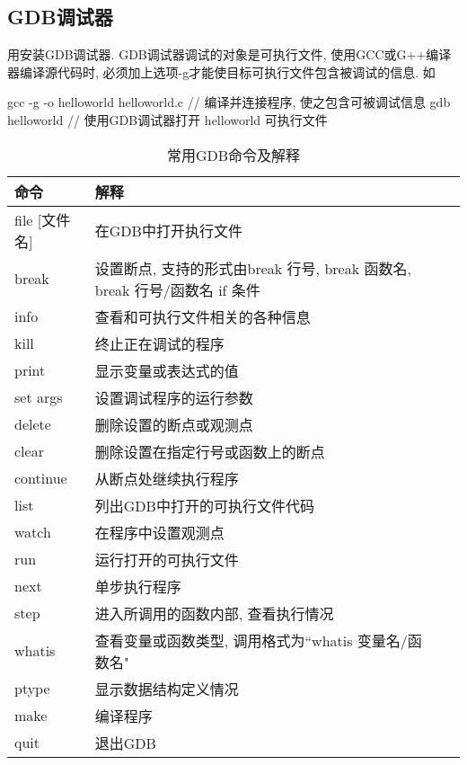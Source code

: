 
\subsection{GDB调试器}
用安装GDB调试器.
GDB调试器调试的对象是可执行文件, 使用GCC或G++编译器编译源代码时, 
必须加上选项-g才能使目标可执行文件包含被调试的信息. 如
\begin{shell}
 gcc -g -o helloworld helloworld.c // 编译并连接程序, 使之包含可被调试信息
 gdb helloworld // 使用GDB调试器打开 helloworld 可执行文件
\end{shell}

\begin{table}[H]
 \small %
\sffamily %
\centering %
\renewcommand{\arraystretch}{1.4} %
\caption{常用GDB命令及解释}
\begin{tabular}{*{2}{l|l}}
 \hline
 \bfseries 命令 & \bfseries 解释\\ \hline
 file [文件名] & 在GDB中打开执行文件\\ \hline
 break & 设置断点, 支持的形式由break 行号, break 函数名, break 行号/函数名 if 条件\\ \hline
 info & 查看和可执行文件相关的各种信息\\ \hline
 kill & 终止正在调试的程序\\ \hline
 print & 显示变量或表达式的值\\ \hline
 set args & 设置调试程序的运行参数\\ \hline
 delete & 删除设置的断点或观测点\\ \hline
 clear & 删除设置在指定行号或函数上的断点\\ \hline
 continue & 从断点处继续执行程序\\ \hline
 list & 列出GDB中打开的可执行文件代码\\ \hline
 watch & 在程序中设置观测点\\ \hline
 run & 运行打开的可执行文件\\ \hline
 next & 单步执行程序\\ \hline
 step & 进入所调用的函数内部, 查看执行情况\\ \hline
 whatis & 查看变量或函数类型, 调用格式为``whatis 变量名/函数名"\\ \hline
 ptype & 显示数据结构定义情况\\ \hline
 make & 编译程序\\ \hline
 quit & 退出GDB\\ \hline
\end{tabular}
\end{table}

